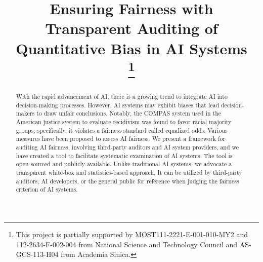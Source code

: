 \documentclass[conference]{IEEEtran}
\begin{document}
\title{Ensuring Fairness with Transparent Auditing of Quantitative Bias in AI Systems\\
\thanks{This project is partially supported by MOST111-2221-E-001-010-MY2 and 112-2634-F-002-004 from National Science and Technology Council and AS-GCS-113-H04 from Academia Sinica.}
}

\DeclarePairedDelimiter{\set}{\{}{\}}
\DeclarePairedDelimiter{\tuple}{(}{)}
\DeclarePairedDelimiter{\abs}{\lvert}{\rvert}

\renewcommand{\implies}{\rightarrow}

\newcommand{\db}{\mathcal{D}}
\newcommand{\model}{\mathcal{M}}
\newcommand{\priv}{R}
\newcommand{\pos}{\hat{P}}
\newcommand{\posm}{\hat{P}_\mathcal{M}}
\newcommand{\tru}{T}
\newcommand{\leg}{L}
\newcommand{\sco}{\hat{S}}
\newcommand{\scom}{\hat{S}_\mathcal{M}}
\newcommand{\calib}{C}

\newcommand{\bye}[1]{}

\author{
\and
{}
}

\maketitle

\begin{abstract}
With the rapid advancement of AI, there is a growing trend to integrate AI into decision-making processes. However, AI systems may exhibit biases that lead decision-makers to draw unfair conclusions. Notably, the COMPAS system used in the American justice system to evaluate recidivism was found to favor racial majority groups; specifically, it violates a fairness standard called equalized odds. Various measures have been proposed to assess AI fairness. We present a framework for auditing AI fairness, involving third-party auditors and AI system providers, and we have created a tool to facilitate systematic examination of AI systems. The tool is open-sourced and publicly available. Unlike traditional AI systems, we advocate a transparent white-box and statistics-based approach. It can be utilized by third-party auditors, AI developers, or the general public for reference when judging the fairness criterion of AI systems.
\end{abstract}
\end{document}
